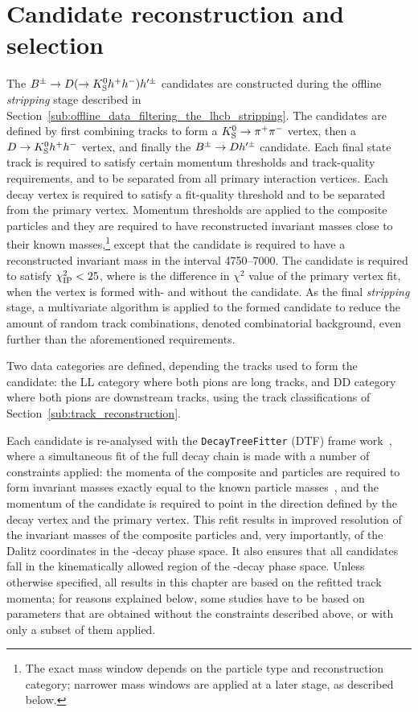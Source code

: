 \section{Candidate reconstruction and selection} %
\label{sec:candidate_selection}

The ${{B}^\pm}\rightarrow{\ensuremath{D}}(\rightarrow{\ensuremath{{K}^0_{\mathrm{S}}}} h^+h^-)h'^\pm$ candidates are constructed during the offline \emph{stripping} stage described in Section~\ref{sub:offline_data_filtering_the_lhcb_stripping}. The candidates are defined by first combining tracks to form a ${{K}^0_{\mathrm{S}}}\rightarrow{\ensuremath{{\pi}^+}}{\ensuremath{{\pi}^-}}$ vertex, then a ${D}\rightarrow{\ensuremath{{K}^0_{\mathrm{S}}}} h^+h^-$ vertex, and finally the ${{B}^\pm}\rightarrow{\ensuremath{D}} h'^\pm$ candidate. Each final state track is required to satisfy certain momentum thresholds and track-quality requirements, and to be separated from all primary interaction vertices. Each decay vertex is required to satisfy a fit-quality threshold and to be separated from the primary vertex. Momentum thresholds are applied to the composite particles and they are required to have reconstructed invariant masses close to their known masses,\footnote{The exact mass window depends on the particle type and reconstruction category; narrower mass windows are applied at a later stage, as described below.} except that the \B candidate is required to have a reconstructed invariant mass in the interval 4750--7000\mevcc. The \B candidate is required to satisfy $\chi^2_{\text{IP}} <25$, where \ipchisq is the difference in $\chi^2$ value of the primary vertex fit, when the vertex is formed with- and without the \B candidate. As the final \emph{stripping} stage, a multivariate algorithm is applied to the formed \B candidate to reduce the amount of random track combinations, denoted combinatorial background, even further than the aforementioned requirements.

Two data categories are defined, depending the tracks used to form the \KS candidate: the LL category where both pions are long tracks, and DD category where both pions are downstream tracks, using the track classifications of Section~\ref{sub:track_reconstruction}.


Each candidate is re-analysed with the \texttt{DecayTreeFitter} (DTF) frame work~\cite{DTF}, where a simultaneous fit of the full decay chain is made with a number of constraints applied: the momenta of the composite \D and \KS particles are required to form invariant masses exactly equal to the known particle masses~\cite{PDG2020}, and the momentum of the \B candidate is required to point in the direction defined by the \B decay vertex and the primary vertex. This refit results in improved resolution of the invariant masses of the composite particles and, very importantly, of the Dalitz coordinates in the \D-decay phase space. It also ensures that all candidates fall in the kinematically allowed region of the \D-decay phase space. Unless otherwise specified, all results in this chapter are based on the refitted track momenta; for reasons explained below, some studies have to be based on parameters that are obtained without the constraints described above, or with only a subset of them applied.



